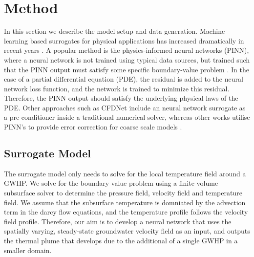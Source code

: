 \documentclass{article} %
\begin{document}
\section{Method}
\label{sec:method}

In this section we describe the model setup and data generation. 
Machine learning based surrogates for physical applications has increased dramatically in recent years \cite{Vinuesa2021,Laubscher2021,Chen2021,Zhu2019,Thuerey2019}. 
A popular method is the physics-informed neural networks (PINN), where a neural network is not trained using typical data sources, but trained such that the PINN output must satisfy some specific boundary-value problem \cite{pinn}. 
In the case of a partial differential equation (PDE), the residual is added to the neural network loss function, and the network is trained to minimize this residual. Therefore, the PINN output should satisfy the underlying physical laws of the PDE. 
Other approaches such as CFDNet \cite{cfdnet} include an neural network surrogate as a pre-conditioner inside a traditional numerical solver, whereas other works utilise PINN's to provide error correction for coarse scale models \cite{Gao2021}. 

\subsection{Surrogate Model}

The surrogate model only needs to solve for the local temperature field around a GWHP. 
We solve for the boundary value problem using a finite volume subsurface solver to determine the pressure field, velocity field and temperature field. 
We assume that the subsurface temperature is domniated by the advection term in the darcy flow equations, and the temperature profile follows the velocity field profile. 
Therefore, our aim is to develop a neural network that uses the spatially varying, steady-state groundwater velocity field as an input, and outputs the thermal plume that develops due to the additional of a single GWHP in a smaller domain. 
\end{document}

